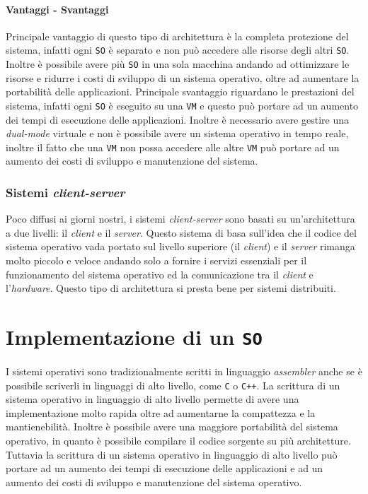         \paragraph{Vantaggi - Svantaggi}
            Principale vantaggio di questo tipo di architettura è la completa protezione del sistema, infatti ogni \texttt{SO} è separato e non può accedere alle risorse degli altri \texttt{SO}. Inoltre è possibile avere più \texttt{SO} in una sola macchina andando ad ottimizzare le risorse e ridurre i costi di sviluppo di un sistema operativo, oltre ad aumentare la portabilità delle applicazioni. Principale svantaggio riguardano le prestazioni del sistema, infatti ogni \texttt{SO} è eseguito su una \texttt{VM} e questo può portare ad un aumento dei tempi di esecuzione delle applicazioni. Inoltre è necessario avere gestire una \textit{dual-mode} virtuale e non è possibile avere un sistema operativo in tempo reale, inoltre il fatto che una \texttt{VM} non possa accedere alle altre \texttt{VM} può portare ad un aumento dei costi di sviluppo e manutenzione del sistema.
    \subsubsection{Sistemi \textit{client-server}}
        Poco diffusi ai giorni nostri, i sistemi \textit{client-server} sono basati su un'architettura a due livelli: il \textit{client} e il \textit{server}. Questo sistema di basa sull'idea che il codice del sistema operativo vada portato sul livello superiore (il \textit{client}) e il \textit{server} rimanga molto piccolo e veloce andando solo a fornire i servizi essenziali per il funzionamento del sistema operativo ed la comunicazione tra il \textit{client} e l'\textit{hardware}. Questo tipo di architettura si presta bene per sistemi distribuiti.
\section{Implementazione di un \texttt{SO}}
    I sistemi operativi sono tradizionalmente scritti in linguaggio \textit{assembler} anche se è possibile scriverli in linguaggi di alto livello, come \texttt{C} o \texttt{C++}. La scrittura di un sistema operativo in linguaggio di alto livello permette di avere una implementazione molto rapida oltre ad aumentarne la compattezza e la mantienebilità. Inoltre è possibile avere una maggiore portabilità del sistema operativo, in quanto è possibile compilare il codice sorgente su più architetture. Tuttavia la scrittura di un sistema operativo in linguaggio di alto livello può portare ad un aumento dei tempi di esecuzione delle applicazioni e ad un aumento dei costi di sviluppo e manutenzione del sistema operativo. 